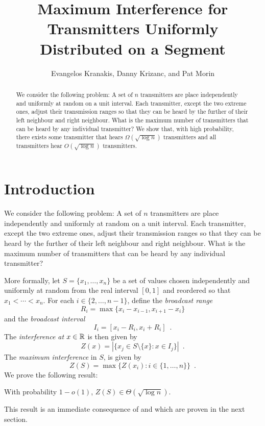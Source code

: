 \documentclass{patmorin}
\title{Maximum Interference for Transmitters Uniformly Distributed on a Segment}
\author{Evangelos Kranakis, Danny Krizanc, and Pat Morin}
\begin{document}
\maketitle

\begin{abstract}
We consider the following problem: A set of $n$ transmitters are
place independently and uniformly at random on a unit interval.  Each
transmitter, except the two extreme ones, adjust their transmission ranges
so that they can be heard by the further of their left neighbour and right
neighbour.  What is the maximum number of transmitters that can be heard
by any individual transmitter?  We show that, with high probability,
there exists some transmitter that hears $\Omega(\sqrt{\log n})$
transmitters and all transmitters hear $O(\sqrt{\log n})$ transmitters.
\end{abstract}

\section{Introduction}

We consider the following problem: A set of $n$ transmitters are
place independently and uniformly at random on a unit interval.  Each
transmitter, except the two extreme ones, adjust their transmission ranges
so that they can be heard by the further of their left neighbour and right
neighbour.  What is the maximum number of transmitters that can be heard
by any individual transmitter? 

More formally, let $S=\{x_1,\ldots,x_n\}$ be a set of values chosen
independently and uniformly at random from the real interval $[0,1]$
and reordered so that $x_1<\cdots<x_n$.  For each $i\in\{2,\ldots,n-1\}$,
define the \emph{broadcast range}
\[
   R_i = \max\{x_i - x_{i-1}, x_{i+1}-x_i\}
\]
and the \emph{broadcast interval}
\[
   I_i = [x_i-R_i,x_i+R_i] \enspace .
\]
The \emph{interference at $x\in\mathbb{R}$} is then given by
\[
   Z(x) = |\{x_j\in S\setminus\{x\}: x \in I_j\}| \enspace .
\]
The \emph{maximum interference} in $S$, is given by
\[
   Z(S)=\max\{Z(x_i):i\in\{1,\ldots,n\}\} \enspace .
\]
We prove the following result:

\begin{thm}
With probability $1-o(1)$, $Z(S)\in \Theta(\sqrt{\log n})$.
\end{thm}

This result is an immediate consequence of  and
 which are proven in the next section.
\end{document}
